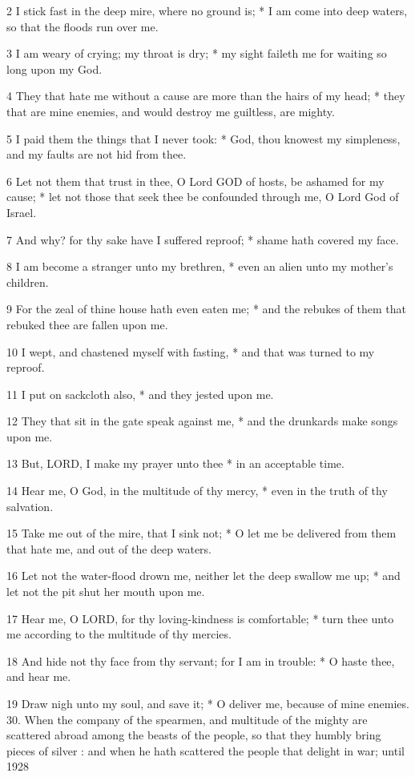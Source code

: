 2 I stick fast in the deep mire, where no ground is;
* I am come into deep waters, so that the floods run over me.

3 I am weary of crying; my throat is dry; * my sight
faileth me for waiting so long upon my God.

4 They that hate me without a cause are more than the
hairs of my head; * they that are mine enemies, and would destroy me guiltless,
are mighty.

5 I paid them the things that I never took: * God,
thou knowest my simpleness, and my faults are not hid from thee.

6 Let not them that trust in thee, O Lord GOD of hosts,
be ashamed for my cause; * let not those that seek thee be confounded
through me, O Lord God of Israel.

7 And why? for thy sake have I suffered reproof; *
shame hath covered my face.

8 I am become a stranger unto my brethren, * even an
alien unto my mother's children.

9 For the zeal of thine house hath even eaten me; *
and the rebukes of them that rebuked thee are fallen upon me.

10 I wept, and chastened myself with fasting, * and
that was turned to my reproof.

11 I put on sackcloth also, * and they jested upon
me.

12 They that sit in the gate speak against me, * and
the drunkards make songs upon me.

13 But, LORD, I make my prayer unto thee * in an acceptable
time.

14 Hear me, O God, in the multitude of thy mercy, *
even in the truth of thy salvation.

15 Take me out of the mire, that I sink not; * O let
me be delivered from them that hate me, and out of the deep waters.

16 Let not the water-flood drown me, neither let the
deep swallow me up; * and let not the pit shut her mouth upon me.

17 Hear me, O LORD, for thy loving-kindness is comfortable;
* turn thee unto me according to the multitude of thy mercies.

18 And hide not thy face from thy servant; for I am
in trouble: * O haste thee, and hear me.

19 Draw nigh unto my soul, and save it; * O deliver
me, because of mine enemies. 30. When the company of the
spearmen, and multitude of the mighty are scattered abroad among the beasts
of the people, so that they humbly bring pieces of silver : and when he
hath scattered the people that delight in war;
until 1928

